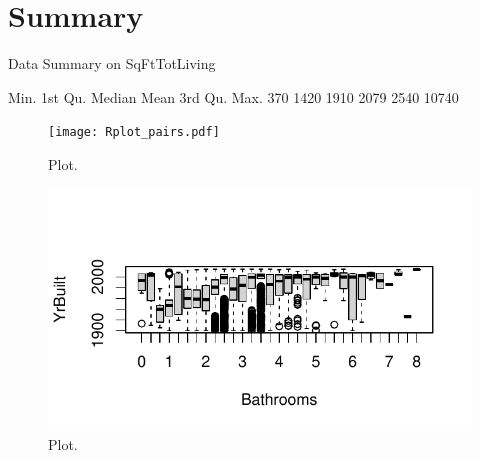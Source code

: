 \documentclass[12pt,letterpaper]{article}
\begin{document}
   



\section{Summary}

Data Summary on SqFtTotLiving
\begin{tabbing}
	
	   Min. 1st Qu.  Median    Mean 3rd Qu.    Max.     
	370    1420    1910    2079    2540   10740 
	
\end{tabbing}


\vspace{.25cm}

\begin{figure}
[h!]\centering
\caption{\footnotesize Plot.}
\label{fig:plot_1}
\texttt{[image: Rplot\_pairs.pdf]}
\end{figure}

\vspace{.25cm}

\begin{figure}
	[h!]\centering
	\caption{\footnotesize Plot.}
	\label{fig:plot_1}
	\includegraphics[width=.85\textwidth]{Rplot01.pdf}
\end{figure}
\end{document}
